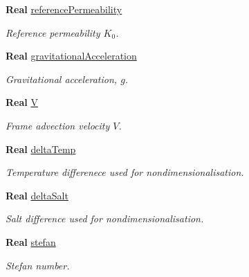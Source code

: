 \begin{DoxyCompactItemize}
\textbf{ Real} \hyperlink{class_mushy_layer_params_a8124873b3f9a1a5657b1b980b99d6b3b}{reference\+Permeability}
\begin{DoxyCompactList}\small\item\em Reference permeability $ K_0 $. \end{DoxyCompactList}\item 
\mbox{\label{class_mushy_layer_params_a8ef8bc3509b02356ed98368f5e484771}} 
\textbf{ Real} \hyperlink{class_mushy_layer_params_a8ef8bc3509b02356ed98368f5e484771}{gravitational\+Acceleration}
\begin{DoxyCompactList}\small\item\em Gravitational acceleration, $ g $. \end{DoxyCompactList}\item 
\mbox{\label{class_mushy_layer_params_afa52e49caf853141c99a7505dfa293b6}} 
\textbf{ Real} \hyperlink{class_mushy_layer_params_afa52e49caf853141c99a7505dfa293b6}{V}
\begin{DoxyCompactList}\small\item\em Frame advection velocity $ V $. \end{DoxyCompactList}\item 
\textbf{ Real} \hyperlink{class_mushy_layer_params_ae221423b95517958c6a2c7acf5c271c6}{delta\+Temp}
\begin{DoxyCompactList}\small\item\em Temperature differenece used for nondimensionalisation. \end{DoxyCompactList}\item 
\textbf{ Real} \hyperlink{class_mushy_layer_params_acea8da7cc75a779bb8dd7967fb3b0586}{delta\+Salt}
\begin{DoxyCompactList}\small\item\em Salt difference used for nondimensionalisation. \end{DoxyCompactList}\item 
\textbf{ Real} \hyperlink{class_mushy_layer_params_ae226ddaa8dc0171b6fcb1e5393ef61a4}{stefan}
\begin{DoxyCompactList}\small\item\em Stefan number. \end{DoxyCompactList}\item 
\mbox{\label{class_mushy_layer_params_ac97e799b81db331d775928ab31c9080e}} 

\end{DoxyCompactItemize}
